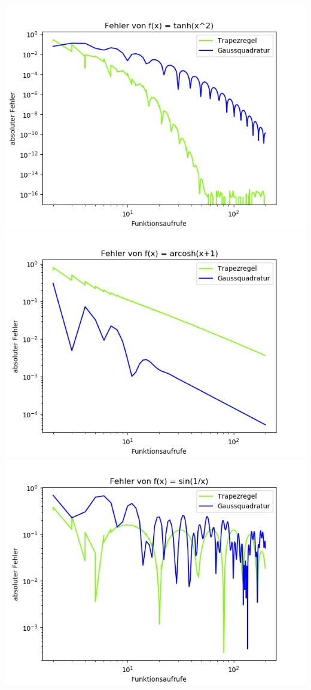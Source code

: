 \includegraphics[width=0.5\linewidth]{gauss-trapez-tanh.png}
\includegraphics[width=0.5\linewidth]{gauss-trapez-arcosh.png}
\includegraphics[width=0.5\linewidth]{gauss-trapez-sin.png}